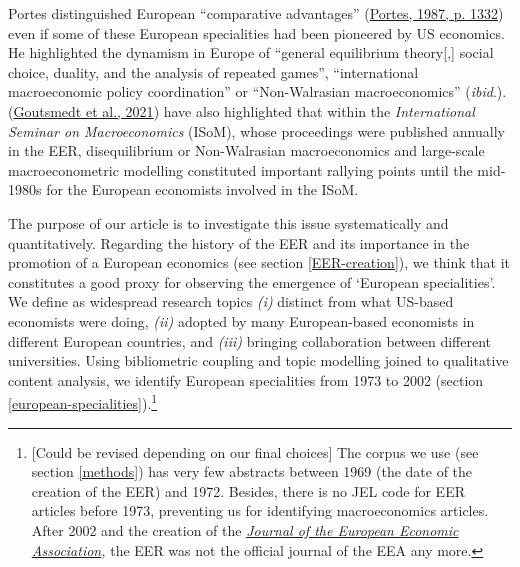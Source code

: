 \documentclass[]{elsarticle} %
\begin{document}
Portes distinguished European ``comparative advantages''
(\protect\hyperlink{ref-portes1987}{Portes, 1987, p. 1332}) even if some
of these European specialities had been pioneered by US economics. He
highlighted the dynamism in Europe of ``general equilibrium
theory{[},{]} social choice, duality, and the analysis of repeated
games'', ``international macroeconomic policy coordination'' or
``Non-Walrasian macroeconomics'' (\emph{ibid}.).
(\protect\hyperlink{ref-goutsmedt2021}{Goutsmedt et al., 2021}) have
also highlighted that within the \emph{International Seminar on
Macroeconomics} (ISoM), whose proceedings were published annually in the
EER, disequilibrium or Non-Walrasian macroeconomics and large-scale
macroeconometric modelling constituted important rallying points until
the mid-1980s for the European economists involved in the ISoM.

The purpose of our article is to investigate this issue systematically
and quantitatively. Regarding the history of the EER and its importance
in the promotion of a European economics (see section
\ref{EER-creation}), we think that it constitutes a good proxy for
observing the emergence of `European specialities'. We define as
widespread research topics \emph{(i)} distinct from what US-based
economists were doing, \emph{(ii)} adopted by many European-based
economists in different European countries, and \emph{(iii)} bringing
collaboration between different universities. Using bibliometric
coupling and topic modelling joined to qualitative content analysis, we
identify European specialities from 1973 to 2002 (section
\ref{european-specialities}).\footnote{{[}Could be revised depending on
  our final choices{]} The corpus we use (see section \ref{methods}) has
  very few abstracts between 1969 (the date of the creation of the EER)
  and 1972. Besides, there is no JEL code for EER articles before 1973,
  preventing us for identifying macroeconomics articles. After 2002 and
  the creation of the \href{https://academic.oup.com/jeea}{\emph{Journal
  of the European Economic Association}}\emph{,} the EER was not the
  official journal of the EEA any more.}
\end{document}
